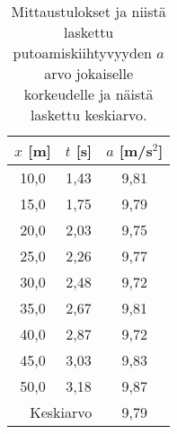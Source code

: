 \documentclass[a4paper,12pt]{article}
\begin{document}






\begin{table}[h]
\begin{center}
\caption{Mittaustulokset ja niistä laskettu putoamiskiihtyvyyden $a$ arvo jokaiselle korkeudelle ja näistä laskettu keskiarvo. }
\label{tulokset}
\begin{tabular}{c|c|c}
$x$ [m]   & $t$ [s]  & $a$ [m/s$^{2}$] \\
\hline
10,0      & 1,43     & 9,81           \\
15,0      & 1,75     & 9,79           \\
20,0      & 2,03     & 9,75           \\
25,0      & 2,26     & 9,77           \\
30,0      & 2,48     & 9,72           \\
35,0      & 2,67     & 9,81           \\
40,0      & 2,87     & 9,72           \\
45,0      & 3,03     & 9,83           \\
50,0      & 3,18     & 9,87           \\
\multicolumn{2}{r}{Keskiarvo} & 9,79          
\end{tabular}
\end{center}
\end{table}
\end{document}

